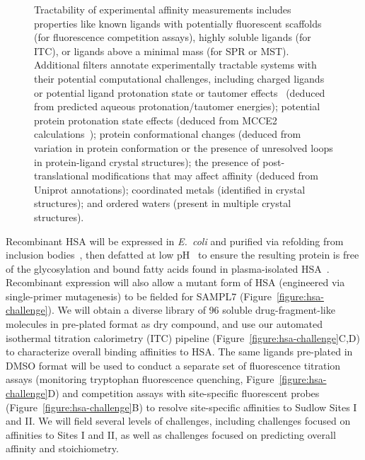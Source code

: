 \documentclass[11pt]{article}
\begin{document}
\begin{figure}
{Tractability of experimental affinity measurements includes properties like known ligands with potentially fluorescent scaffolds (for fluorescence competition assays), highly soluble ligands (for ITC), or ligands above a minimal mass (for SPR or MST).
Additional filters annotate experimentally tractable systems with their potential computational challenges, including charged ligands or potential ligand protonation state or tautomer effects~\cite{Martin:2009:JournalofComputer-AidedMolecularDesign} (deduced from predicted aqueous protonation/tautomer energies); potential protein protonation state effects (deduced from MCCE2 calculations~\cite{Song:2009:JournalofComputationalChemistry}); protein conformational changes (deduced from variation in protein conformation or the presence of unresolved loops in protein-ligand crystal structures); the presence of post-translational modifications that may affect affinity (deduced from Uniprot annotations); coordinated metals (identified in crystal structures); and ordered waters (present in multiple crystal structures).
}
\end{figure}

Recombinant HSA will be expressed in \emph{E.~coli} and purified via refolding from inclusion bodies~\cite{Latta:1987:Bio/Technology}, then defatted at low pH~\cite{Lang:2015:BiotechnologyProgress} to ensure the resulting protein is free of the glycosylation and bound fatty acids found in plasma-isolated HSA~\cite{Lang:2015:BiotechnologyProgress}.
Recombinant expression will also allow a mutant form of HSA (engineered via single-primer mutagenesis) to be fielded for SAMPL7 (Figure~\ref{figure:hsa-challenge}).
We will obtain a diverse library of 96 soluble drug-fragment-like molecules in pre-plated format as dry compound, and use our automated isothermal titration calorimetry (ITC) pipeline (Figure~\ref{figure:hsa-challenge}C,D) to characterize overall binding affinities to HSA.
The same ligands pre-plated in DMSO format will be used to conduct a separate set of fluorescence titration assays (monitoring tryptophan fluorescence quenching, Figure~\ref{figure:hsa-challenge}D) and competition assays with site-specific fluorescent probes (Figure~\ref{figure:hsa-challenge}B) to resolve site-specific affinities to Sudlow Sites I and II.
We will field several levels of challenges, including challenges focused on affinities to Sites I and II, as well as challenges focused on predicting overall affinity and stoichiometry.
\end{document}
